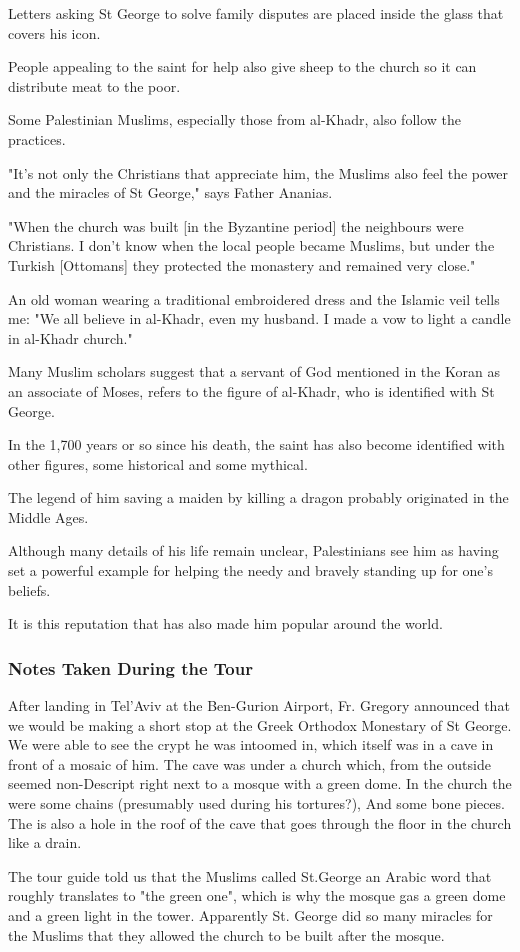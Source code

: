 \documentclass[letterpaper]{report}
\begin{document}
\begin{multicols}{2}
Letters asking St George to solve family disputes are placed inside the glass that covers his icon.

People appealing to the saint for help also give sheep to the church so it can distribute meat to the poor.

Some Palestinian Muslims, especially those from al-Khadr, also follow the practices.

"It's not only the Christians that appreciate him, the Muslims also feel the power and the miracles of St George," says Father Ananias.

"When the church was built [in the Byzantine period] the neighbours were Christians. I don't know when the local people became Muslims, but under the Turkish [Ottomans] they protected the monastery and remained very close."

An old woman wearing a traditional embroidered dress and the Islamic veil tells me: "We all believe in al-Khadr, even my husband. I made a vow to light a candle in al-Khadr church."

Many Muslim scholars suggest that a servant of God mentioned in the Koran as an associate of Moses, refers to the figure of al-Khadr, who is identified with St George.

In the 1,700 years or so since his death, the saint has also become identified with other figures, some historical and some mythical.

The legend of him saving a maiden by killing a dragon probably originated in the Middle Ages.

Although many details of his life remain unclear, Palestinians see him as having set a powerful example for helping the needy and bravely standing up for one's beliefs.

It is this reputation that has also made him popular around the world.

\subsubsection{Notes Taken During the Tour}
After landing in Tel'Aviv at the Ben-Gurion Airport, Fr. Gregory announced that we would be making a short stop at the Greek Orthodox Monestary of St George. We were able to see the crypt he was intoomed in, which itself was in a cave in front of a mosaic of him. The cave was under a church which, from the outside seemed non-Descript right next to a mosque with a green dome. In the church the were some chains (presumably used during his tortures?), And some bone pieces. The is also a hole in the roof of the cave that goes through the floor in the church like a drain.

The tour guide told us that the Muslims called St.George an Arabic word that roughly translates to "the green one", which is why the mosque gas a green dome and a green light in the tower. Apparently St. George did so many miracles for the Muslims that they allowed the church to be built after the mosque.
\end{multicols}
\end{document}
